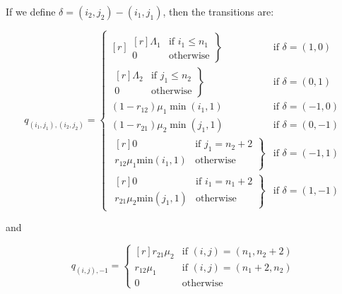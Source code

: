 \documentclass{article}
\begin{document}
If we define $\delta = (i_2, j_2) - (i_1, j_1)$, then the transitions are:

\begin{equation}
  q_{(i_1, j_1),(i_2, j_2)} = \left\{
  \begin{matrix*}[ r ]
    \left. \begin{matrix*}[ r ]
      \Lambda_1 & \text{if } i_1 \leq n_1 \\
      0 & \text{otherwise}
    \end{matrix*} \right\} & \text{if } \delta = (1, 0) \\
    \left. \begin{matrix*}[ r ]
      \Lambda_2 & \text{if } j_1 \leq n_2 \\
      0 & \text{otherwise}
    \end{matrix*} \right\} & \text{if } \delta = (0, 1) \\
    (1 - r_{12})\mu_1 \min(i_1, 1) & \text{if } \delta = (-1, 0) \\
    (1 - r_{21})\mu_2 \min(j_1, 1) & \text{if } \delta = (0, -1) \\
    \left. \begin{matrix*}[ r ]
      0 & \text{if } j_1 = n_2 + 2 \\
      r_{12}\mu_1 \text{min}(i_1, 1) & \text{otherwise}
    \end{matrix*} \right\} & \text{if } \delta = (-1, 1) \\
    \left. \begin{matrix*}[ r ]
      0 & \text{if } i_1 = n_1 + 2 \\
      r_{21}\mu_2 \text{min}(j_1, 1) & \text{otherwise}
    \end{matrix*} \right\} & \text{if } \delta = (1, -1)
  \end{matrix*} \right.
\end{equation}

and

\begin{equation}
  q_{(i, j), -1} = \left\{
  \begin{matrix*}[ r ]
    r_{21}\mu_2 & \text{if } (i, j) = (n_1, n_2 + 2) \\
    r_{12}\mu_1 & \text{if } (i, j) = (n_1 + 2, n_2) \\
    0 & \text{otherwise}
  \end{matrix*}
  \right.
\end{equation}




\end{document}
